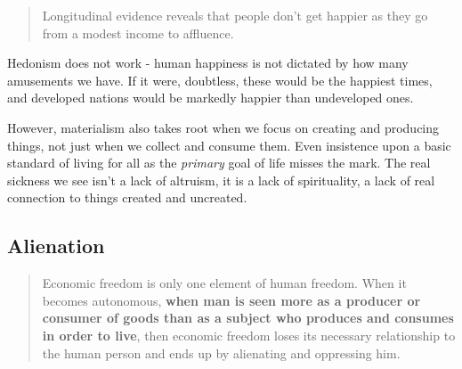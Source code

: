 \documentclass[letterpaper]{article}
\begin{document}
\begin{quote}
  Longitudinal evidence reveals that people don't get happier as they go from a modest income to affluence.
\end{quote}

Hedonism does not work - human happiness is not dictated by how many amusements we have. If it were, doubtless, these would be the happiest times, and developed nations would be markedly happier than undeveloped ones.

However, materialism also takes root when we focus on creating and producing things, not just when we collect and consume them. Even insistence upon a basic standard of living for all as the \textit{primary} goal of life misses the mark. The real sickness we see isn't a lack of altruism, it is a lack of spirituality, a lack of real connection to things created and uncreated.


\subsection{Alienation}

\begin{quote}
  Economic freedom is only one element of human freedom. When it becomes autonomous, \textbf{when man is seen more as a producer or consumer of goods than as a subject who produces and consumes in order to live}, then economic freedom loses its necessary relationship to the human person and ends up by alienating and oppressing him.
\end{quote}


\end{document}
